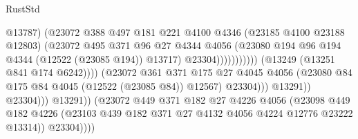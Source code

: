 \begin{lexlean}{RustStd}
\begin{coremodule}
                                                          @13787)
                                                        (@23072
                                                          @388
                                                          @497
                                                          @181
                                                          @221
                                                          @4100
                                                          @4346
                                                          (@23185 @4100 @23188 @12803)
                                                          (@23072
                                                            @495
                                                            @371
                                                            @96
                                                            @27
                                                            @4344
                                                            @4056
                                                            (@23080
                                                              @194
                                                              @96
                                                              @194
                                                              @4344
                                                              (@12522 (@23085 @194))
                                                              @13717)
                                                            @23304)))))))))))
                                      (@13249 (@13251 @841 @174 @6242))))
                                  (@23072
                                    @361
                                    @371
                                    @175
                                    @27
                                    @4045
                                    @4056
                                    (@23080 @84 @175 @84 @4045 (@12522 (@23085 @84)) @12567)
                                    @23304)))
                              @13291))
                          @23304)))
                    @13291))
                (@23072
                  @449
                  @371
                  @182
                  @27
                  @4226
                  @4056
                  (@23098
                    @449
                    @182
                    @4226
                    (@23103 @439 @182 @371 @27 @4132 @4056 @4224 @12776 @23222 @13314))
                  @23304))))

\end{coremodule}
\end{lexlean}
